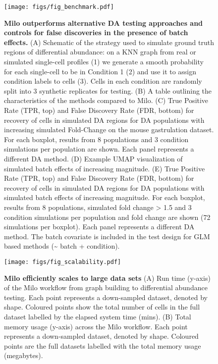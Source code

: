 \documentclass[
  10pt,
]{article}
\begin{document}
\begin{figure}
\centering
\texttt{[image: figs/fig\_benchmark.pdf]}
\caption{\label{fig:fig-2}\textbf{Milo outperforms alternative DA testing approaches and controls for false discoveries in the presence of batch effects.} (A) Schematic of the strategy used to simulate ground truth regions of differential abundance: on a KNN graph from real or simulated single-cell profiles (1) we generate a smooth probability for each single-cell to be in Condition 1 (2) and use it to assign condition labels to cells (3). Cells in each condition are randomly split into 3 synthetic replicates for testing.
(B) A table outlining the characteristics of the methods compared to Milo.
(C) True Positive Rate (TPR, top) and False Discovery Rate (FDR, bottom) for recovery of cells in simulated DA regions for DA populations with increasing simulated Fold-Change on the mouse gastrulation dataset. For each boxplot, results from 8 populations and 3 condition simulations per population are shown. Each panel represents a different DA method. (D) Example UMAP visualization of simulated batch effects of increasing magnitude.
(E) True Positive Rate (TPR, top) and False Discovery Rate (FDR, bottom) for recovery of cells in simulated DA regions for DA populations with simulated batch effects of increasing magnitude. For each boxplot, results from 8 populations, simulated fold change \textgreater{} 1.5 and 3 condition simulations per population and fold change are shown (72 simulations per boxplot). Each panel represents a different DA method. The batch covariate is included in the test design for GLM based methods (\textasciitilde{} batch + condition).}
\end{figure}






\begin{figure}
\centering
\texttt{[image: figs/fig\_scalability.pdf]}
\caption{\label{fig:fig-3}\textbf{Milo efficiently scales to large data sets}
(A) Run time (y-axis) of the Milo workflow from graph building to differential abundance testing. Each point represents a down-sampled dataset, denoted by shape. Coloured points show the total number of cells in the full dataset labelled by the elapsed system time (mins).
(B) Total memory usage (y-axis) across the Milo workflow. Each point represents a down-sampled dataset, denoted by shape. Coloured points are the full datasets labelled with the total memory usage (megabytes).}
\end{figure}
\end{document}
